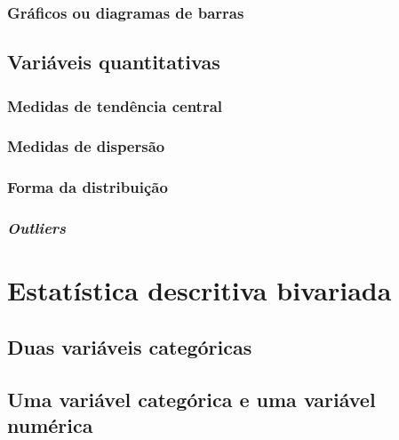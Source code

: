 \documentclass[
  letterpaper,
  DIV=11,
  numbers=noendperiod]{scrreprt}
\begin{document}
\section{Gráficos ou diagramas de
barras}\label{gruxe1ficos-ou-diagramas-de-barras}

\chapter{Variáveis quantitativas}\label{variuxe1veis-quantitativas}

\section{\texorpdfstring{\textbf{Medidas de tendência
central}}{Medidas de tendência central}}\label{medidas-de-tenduxeancia-central}

\section{\texorpdfstring{\textbf{Medidas de
dispersão}}{Medidas de dispersão}}\label{medidas-de-dispersuxe3o}

\section{\texorpdfstring{\textbf{Forma da
distribuição}}{Forma da distribuição}}\label{forma-da-distribuiuxe7uxe3o}

\section{\texorpdfstring{\emph{Outliers}}{Outliers}}\label{outliers}

\part{Estatística descritiva bivariada}

\chapter{Duas variáveis
categóricas}\label{duas-variuxe1veis-categuxf3ricas}

\chapter{Uma variável categórica e uma variável
numérica}\label{uma-variuxe1vel-categuxf3rica-e-uma-variuxe1vel-numuxe9rica}
\end{document}
